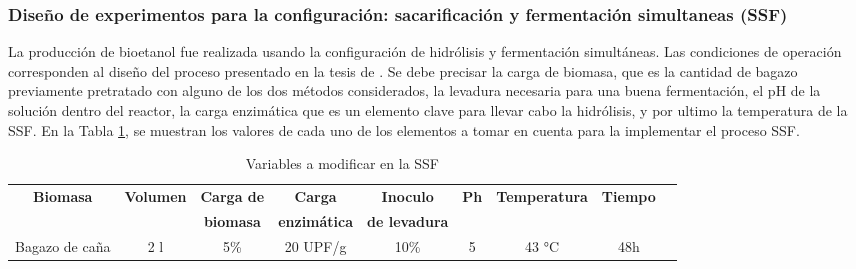 \documentclass[12pt]{article}
\begin{document}


	
		\subsubsection{Diseño de experimentos para la configuración:
			sacarificación y fermentación simultaneas (SSF)}
		\label{SacariSF}	
		
		
		La producción de bioetanol fue realizada usando la configuración de hidrólisis y fermentación simultáneas. Las condiciones de operación corresponden al diseño del proceso presentado en la tesis de \cite{Arturo2022evaluacion}. Se debe precisar la carga de biomasa, que es la cantidad de bagazo previamente pretratado con alguno de los dos métodos considerados, la levadura necesaria para una buena fermentación, el pH de la solución dentro del reactor, la carga enzimática que es un elemento clave  para llevar  cabo la hidrólisis, y por ultimo la temperatura de la SSF. En la Tabla \ref{tab:Variables a modificar para la hidrolisis y fermentacion}, se muestran los valores de cada uno de los elementos a tomar en cuenta para la implementar el proceso SSF. \\[0.5em]
		
		\begin{table} [h!]
			\centering
			\caption{Variables a modificar en la SSF}
			\label{tab:Variables a modificar para la hidrolisis y fermentacion}
			\small
			\resizebox{17cm}{!} {
			\begin{tabular}{|c|c|c|c|c|c|c|c|c|}
				\hline
			\textbf{Biomasa}  &\textbf{ Volumen}  & \textbf{Carga de } & \textbf{Carga}  & \textbf{Inoculo}  &\textbf{ Ph}  & \textbf{Temperatura } & \textbf{Tiempo}   \\
				 &   & \textbf{ biomasa}  & \textbf{enzimática } & \textbf{de levadura } & &  &     \\
				
				\hline
			\multirow{2}{*}{Bagazo de caña} &\multirow{2}{*}{2 l}  &\multirow{2}{*}{5\%}  & \multirow{2}{*}{20 UPF/g } & \multirow{2}{*}{10\% } &\multirow{2}{*}{ 5} & \multirow{2}{*}{43 °C} & \multirow{2}{*}{48h }   \\
			  &   & & &  &  & &     \\		
				\hline
			\end{tabular}}
		\end{table}
		
\end{document}
